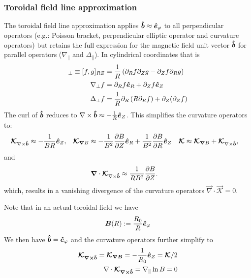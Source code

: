 
\subsubsection{Toroidal field line approximation}\label{sec:torfieldlineapprox}
The toroidal field line approximation applies \(\bm{\hat{b}}\approx \bm{\hat{e}}_\varphi\) to all perpendicular operators
(e.g.: Poisson bracket, perpendicular elliptic operator and curvature operators)
but retains the full expression for the magnetic field unit vector \(\bm{\hat{b}}\)
for parallel operators (\(\nabla_\parallel\) and \(\Delta_\parallel\)).
In cylindrical coordinates that is
\begin{align}
[f,g]_\perp \equiv [f,g]_{RZ} &= \frac{1}{R} \left(\partial_R f\partial_Z g - \partial_Z f\partial_R g\right) \\
\nabla_\perp f &= \partial_R f \ehat_R + \partial_Z f \ehat_Z \\
\Delta_\perp f &= \frac{1}{R}\partial_R \left( R \partial_R f\right) + \partial_Z(\partial_Z f)
\label{}
\end{align}
The curl of $\bm{\hat{b}}$ reduces to
 $\nabla\times\bm{\hat{b}} \approx -  \frac{1}{R} \bm{\hat{e}}_Z$.
This simplifies the curvature operators to:
\begin{align}
{\boldsymbol{\mathcal{K}}}_{{\nabla\times\bm{\hat{b}}}}  &\approx  -  \frac{1}{B R} \bm{\hat{e}}_Z , &
{\boldsymbol{ \mathcal{K} }}_{{\boldsymbol{\nabla}}  B}  &\approx  -\frac{1}{B^2}\frac{\partial B}{\partial Z}\bm{\hat{e}}_R +\frac{1}{B^2} \frac{\partial B}{\partial R}\bm{\hat{e}}_Z &
{\boldsymbol{ \mathcal{K} }} &\approx {\boldsymbol{ \mathcal{K} }}_{{\boldsymbol{\nabla}}  B}  +{\boldsymbol{ \mathcal{K} }}_{{\nabla\times\bm{\hat{b}}}} ,
\end{align}
and
\begin{align}
 {\boldsymbol{\nabla}} \cdot {\boldsymbol{\mathcal{K}}}_{{\nabla\times\bm{\hat{b}}}} &\approx \frac{1}{R B^2} \frac{\partial B}{\partial Z}.
\end{align}
which, results in a vanishing divergence of the curvature operators \( \vec{\nabla} \cdot \vec{ \mathcal{K} } = 0\).

Note that in an actual toroidal field we have
\begin{align}
  {\boldsymbol{B}}(R) := \frac{R_0}{R} \bm{\hat{e}}_\varphi
  \label{}
\end{align}
We then have $\bm{\hat{b}} = \bm{\hat{e}}_\varphi$ and the curvature operators further
simplify to
\begin{align}
  {\boldsymbol{ \mathcal K_{\nabla\times\bm{\hat{b}}}}} = {\boldsymbol{ \mathcal K_{\nabla B}}} = -\frac{1}{R_0} \bm{\hat{e}}_Z =
{\boldsymbol{ \mathcal K}}/2\\
  \nabla\cdot{\boldsymbol{\mathcal K_{{\nabla\times\bm{\hat{b}}}}}}=
    \nabla_\parallel \ln B = 0
    \label{}
\end{align}

